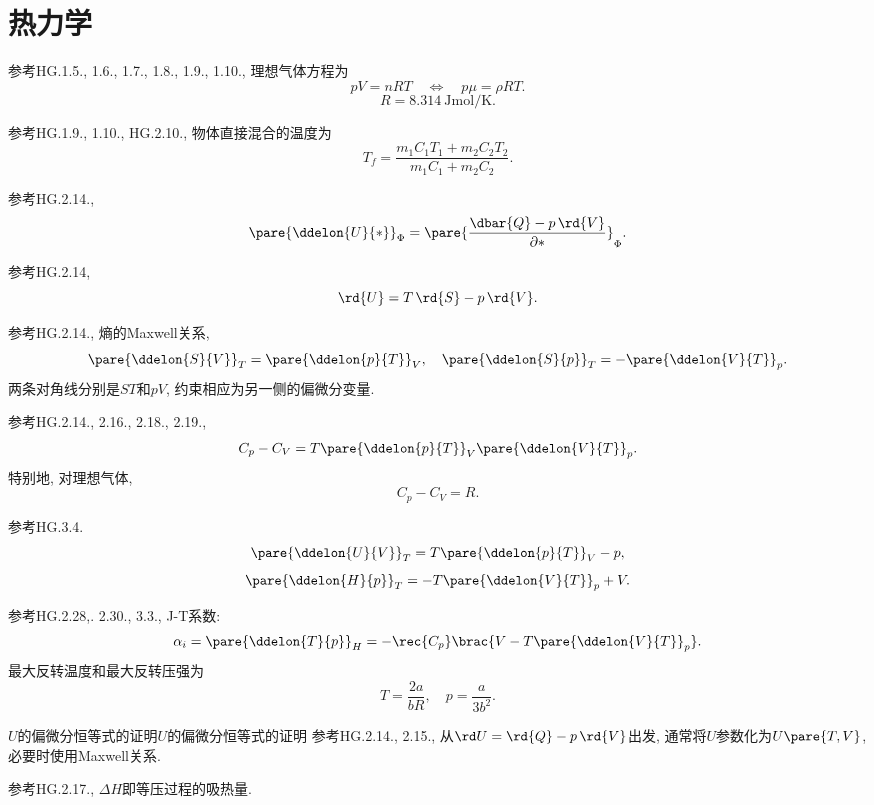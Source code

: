 \documentclass{ctexart}
\begin{document}
\section*{热力学} %
\label{sec:热力学}

\begin{finale}
	参考HG.1.5., 1.6., 1.7., 1.8., 1.9., 1.10., 理想气体方程为
	\[ pV = nRT \quad \Longleftrightarrow \quad p\mu = \rho RT. \]
	\[ R = \SI{8.314}{\joule\mole\per\kelvin}. \]
\end{finale}
\begin{finale}
	参考HG.1.9., 1.10., HG.2.10., 物体直接混合的温度为
	\[ T_f = \frac{m_1C_1T_1 + m_2C_2T_2}{m_1C_1+m_2C_2}. \]
\end{finale}
\begin{finale}
	参考HG.2.14.,
	\[ \pare{\ddelon{U}{*}}_{\Phi} = \pare{\frac{\dbar{Q}-p\,\rd{V}}{\partial *}}_{\Phi}. \]
\end{finale}
\begin{finale}
	参考HG.2.14,
	\[ \rd{U} = T\,\rd{S} - p\,\rd{V}. \]
\end{finale}
\begin{finale}
	参考HG.2.14., 熵的Maxwell关系,
	\[ \pare{\ddelon{S}{V}}_T = \pare{\ddelon{p}{T}}_V,\quad \pare{\ddelon{S}{p}}_T = -\pare{\ddelon{V}{T}}_p. \]
	两条对角线分别是$ST$和$pV$, 约束相应为另一侧的偏微分变量.
\end{finale}
\begin{finale}
	参考HG.2.14., 2.16., 2.18., 2.19.,
	\[ C_p - C_V = T\pare{\ddelon{p}{T}}_V\pare{\ddelon{V}{T}}_p. \]
	特别地, 对理想气体,
	\[ C_p - C_V = R. \]
\end{finale}
\begin{finale}
	参考HG.3.4.
	\[ \pare{\ddelon{U}{V}}_T = T\pare{\ddelon{p}{T}}_V - p, \]
	\[ \pare{\ddelon{H}{p}}_T = -T\pare{\ddelon{V}{T}}_p + V. \]
\end{finale}
\begin{finale}
	参考HG.2.28,. 2.30., 3.3., J-T系数:
	\[ \alpha_i = \pare{\ddelon{T}{p}}_{H} = -\rec{C_p}\brac{V-T\pare{\ddelon{V}{T}}_p}. \]
	最大反转温度和最大反转压强为
	\[ T=\frac{2a}{bR},\quad p=\frac{a}{3b^2}. \]
\end{finale}
\begin{reflex}
	{$U$的偏微分恒等式的证明}{$U$的偏微分恒等式的证明} 参考HG.2.14., 2.15., 从$\rd U = \rd{Q} - p\,\rd{V}$出发, 通常将$U$参数化为$U\pare{T,V}$, 必要时使用Maxwell关系.
\end{reflex}
\begin{finale}
	参考HG.2.17., $\Delta H$即等压过程的吸热量.
\end{finale}
\end{document}
